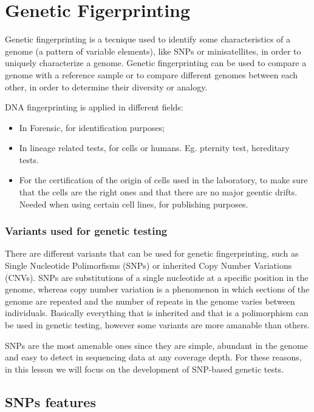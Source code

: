 \graphicspath{{chapters/GeneticFingImages/}}
\chapter*{Genetic Figerprinting}

Genetic fingerprinting is a tecnique used to identify some characteristics of a genome (a pattern of variable elements), like SNPs or minisatellites, in order to uniquely characterize a genome. Genetic fingerprinting can be used to compare a genome with a reference sample or to compare different genomes between each other, in order to determine their diversity or analogy. 

DNA fingerprinting is applied in different fields:

\begin{itemize}
	\item In Forensic, for identification purposes;
	\item In lineage related tests, for cells or humans. Eg. pternity test, hereditary tests.
	\item For the certification of the origin of cells used in the laboratory, to make sure that the cells are the right ones and that there are no major geentic drifts. Needed when using certain cell lines, for publishing purposes.
\end{itemize}


\subsection*{Variants used for genetic testing}

There are different variants that can be used for genetic fingerprinting, such as Single Nucleotide Polimorfisms (SNPs) or inherited Copy Number Variations (CNVs).
SNPs are substitutions of a single nucleotide at a specific position in the genome, whereas copy number variation is a phenomenon in which sections of the genome are repeated and the number of repeats in the genome varies between individuals.
Basically everything that is inherited and that is a polimorphism can be used in genetic testing, however some variants are more amanable than others.

SNPs are the most amenable ones since they are simple, abundant in the genome and easy to detect in sequencing data at any coverage depth. For these reasons, in this lesson we will focus on the development of SNP-based genetic tests.

\section*{SNPs features}

